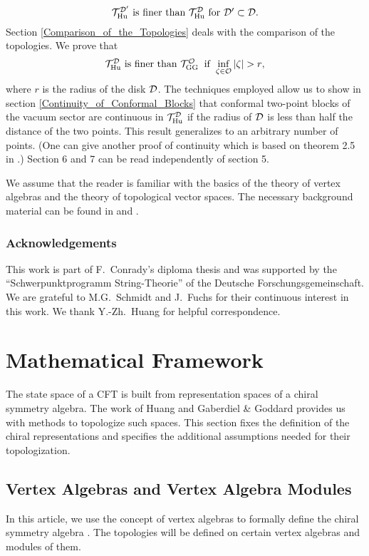 \documentclass[a4paper,12pt,twoside]{article}
\newcommand{\DS}{\displaystyle}
\renewcommand{\c}[1]{{\cal #1}}
\newcommand{\cT}{{\cal T}}
\renewcommand{\O}{\c{O}}
\newcommand{\D}{\c{D}}
\newcommand{\Hu}{{\rm Hu}}
\newcommand{\GG}{{\rm GG}}
\newcommand{\THud}{\cT_{\Hu}^{\D}}
\newcommand{\THudp}{\cT_{\Hu}^{\D'}}
\newcommand{\TGG}{\cT_{\GG}^{\O}}
\begin{document}
$$\mbox{$\THudp$ is finer than $\THud$ for $\D'\subset\D$.}$$
Section \ref{Comparison_of_the_Topologies} deals with
the comparison of the topologies. We prove that
$$\mbox{$\THud$ is finer than $\TGG$\hspace{2mm}if\hspace{2mm}$\DS\inf_{\zeta\in\O} |\zeta| > r$,}$$
where $r$ is the radius of the disk $\D$. The techniques employed
allow us to show in section \ref{Continuity_of_Conformal_Blocks}
that conformal two-point blocks of the vacuum sector are
continuous in $\THud$ if the radius of $\D$ is less than half the
distance of the two points. This result generalizes to an
arbitrary number of points.
(One can give another proof of continuity which is based on theorem 2.5 in \cite{Huang}.)
Section 6 and 7 can be read
independently of section 5.

We assume that the reader is familiar with the basics
of the theory of vertex algebras
and the theory of topological vector spaces.
The necessary background material can be found in
\cite{Kac,Frenkel} and
\cite{Narici,Treves}.
\subsubsection*{Acknowledgements}
This work is part of F.\ Conrady's diploma thesis and was
supported by the ``Schwer\-punktprogramm String-Theorie'' of the
Deutsche Forschungsgemeinschaft. We are grateful to M.G.\ Schmidt
and J.\ Fuchs for their continuous interest in this work. We thank
Y.-Zh.\ Huang for helpful correspondence.
\section{Mathematical Framework}
\label{Mathematical_Framework}
The state space of
a CFT is built from representation spaces of a chiral symmetry algebra. The
work of Huang and Gaberdiel \& Goddard provides
us with methods to topologize such spaces.
This section fixes the definition of the chiral representations and specifies the additional
assumptions needed for their topologization.
\subsection{Vertex Algebras and Vertex Algebra Modules}
In this article, we use the concept of vertex algebras
to formally define the chiral symmetry algebra
\cite{FLM,Kac,Frenkel}. The topologies
will be defined on certain vertex algebras and
modules of them.
\end{document}
